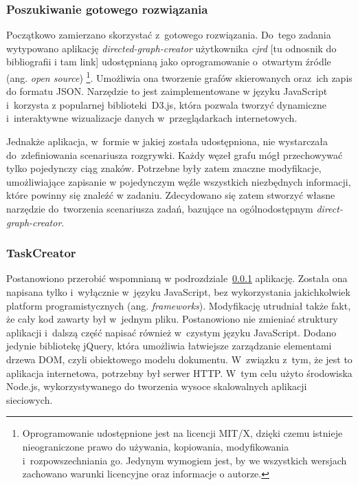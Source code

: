 \documentclass[12pt,a4paper,polish,thesis]{dcsbook}
\begin{document}
{	\subsubsection{Poszukiwanie gotowego rozwiązania} \label{solution}

	Początkowo zamierzano skorzystać z~gotowego rozwiązania. Do~tego zadania wytypowano aplikację \textit{directed-graph-creator} użytkownika \textit{cjrd} [tu odnosnik do bibliografii i tam link] udostępnianą jako oprogramowanie o~otwartym źródle (ang. \textit{open source}) \footnote{Oprogramowanie udostępnione jest na licencji MIT/X, dzięki czemu istnieje nieograniczone prawo do używania, kopiowania, modyfikowania i~rozpowszechniania go. Jedynym wymogiem jest, by we wszystkich wersjach zachowano warunki licencyjne oraz informacje o autorze.}. Umożliwia ona tworzenie grafów skierowanych oraz~ich zapis do formatu JSON. Narzędzie to jest zaimplementowane w języku JavaScript i~korzysta z popularnej biblioteki~D3.js, która pozwala tworzyć dynamiczne i~interaktywne wizualizacje danych w~przeglądarkach internetowych.

	Jednakże aplikacja, w~formie w jakiej została udostępniona, nie wystarczała do~zdefiniowania scenariusza rozgrywki. Każdy węzeł grafu mógł przechowywać tylko pojedynczy ciąg znaków. Potrzebne były zatem znaczne modyfikacje, umożliwiające zapisanie w pojedynczym węźle wszystkich niezbędnych informacji, które powinny się znaleźć w zadaniu. Zdecydowano się zatem stworzyć własne narzędzie do~tworzenia scenariusza zadań, bazujące na ogólnodostępnym \textit{direct-graph-creator}.

	\subsubsection{TaskCreator}

	Postanowiono przerobić wspomnianą w podrozdziale~\ref{solution} aplikację. Została ona napisana tylko i~wyłącznie w~języku JavaScript, bez wykorzystania jakichkolwiek platform programistycznych (ang. \textit{frameworks}). Modyfikację utrudniał także fakt, że cały kod zawarty był w~jednym pliku. Postanowiono nie zmieniać struktury aplikacji i~dalszą część napisać również w~czystym języku JavaScript. Dodano jedynie bibliotekę jQuery, która umożliwia łatwiejsze zarządzanie elementami drzewa DOM, czyli obiektowego modelu dokumentu. W~związku z~tym, że jest to aplikacja internetowa, potrzebny był serwer HTTP. W~tym celu użyto środowiska Node.js, wykorzystywanego do tworzenia wysoce skalowalnych aplikacji sieciowych.

}
\end{document}
